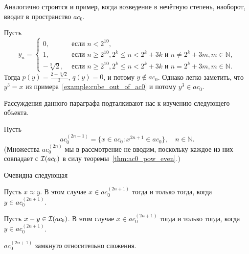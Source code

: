 Аналогично строится и пример, когда возведение в нечётную степень, наоборот, вводит в пространство $ac_0$.

\begin{example}
	Пусть
	\begin{equation}
		y_n = \begin{cases}
			 0, & \mbox{~если~} n < 2^{10},
			\\
			 1, & \mbox{~если~} n \ge 2^{10}, 2^k\le n < 2^k+3k \mbox{~и~}  n\neq 2^k + 3m, m\in\mathbb{N},
			\\
			-\sqrt[3]{2}, & \mbox{~если~} n \ge 2^{10}, 2^k\le n < 2^k+3k \mbox{~и~}  n  =  2^k + 3m, m\in\mathbb{N}.
		\end{cases}
	\end{equation}
	Тогда $p(y) = \frac{2-\sqrt[3]2}{3}$, $q(y) = 0$, и потому $y \notin ac_0$.
	Однако легко заметить, что $y^3 = x$ из примера~\ref{example:cube_out_of_ac0} и потому $y^3\in ac_0$.
\end{example}




Рассуждения данного параграфа подталкивают нас к изучению следующего объекта.

Пусть
\begin{equation}
	ac_0^{(2n+1)} = \{ x\in ac_0 : x^{2n+1} \in ac_0\}, \quad n\in\mathbb N
	.
\end{equation}
(Множества $ac_0^{(2n)}$ мы в рассмотрение не вводим, поскольку каждое из них совпадает с $\mathcal{I}(ac_0)$ в силу теоремы~\ref{thm:ac0_pow_even}.)

Очевидна следующая
\begin{lemma}
	Пусть $x \approx y$.
	В этом случае $x \in ac_0^{(2n+1)}$ тогда и только тогда, когда $y \in ac_0^{(2n+1)}$.
\end{lemma}

\begin{lemma}
	Пусть $x - y \in \mathcal{I}(ac_0)$.
	В этом случае $x \in ac_0^{(2n+1)}$ тогда и только тогда, когда $y \in ac_0^{(2n+1)}$.
\end{lemma}


\begin{hypothesis}
	$ac_0^{(2n+1)}$ замкнуто относительно сложения.
\end{hypothesis}

